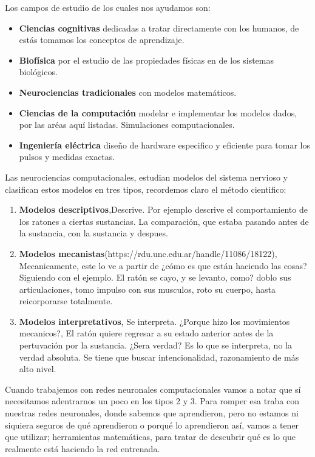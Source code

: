 Los campos de estudio de los cuales nos ayudamos son:
\begin{itemize}
 \item  \textbf{Ciencias cognitivas} dedicadas a tratar directamente con los humanos, de estás tomamos los conceptos de aprendizaje.
 \item  \textbf{Biofísica}  por el estudio de las propiedades físicas en de los sistemas biológicos. 
 \item  \textbf{Neurociencias tradicionales} con modelos matemáticos. 
 
 \item  \textbf{Ciencias de la computación} modelar e implementar los modelos dados, por las aréas aquí listadas. Simulaciones computacionales. 
 
 \item  \textbf{Ingeniería eléctrica} diseño de hardware especifico y eficiente para tomar los pulsos y medidas exactas.  
 
\end{itemize}

Las neurociencias computacionales, estudian modelos del sistema nervioso y clasifican estos modelos en tres tipos, recordemos claro el método cientifico: 

\begin{enumerate}
 \item \textbf{Modelos descriptivos},Descrive. Por ejemplo descrive el comportamiento de los ratones a ciertas sustancias. La comparación, que estaba pasando antes de la sustancia, con la sustancia y despues. 
  
 \item \textbf{Modelos mecanistas}(https://rdu.unc.edu.ar/handle/11086/18122), Mecanicamente, este lo ve a partir de  ¿cómo es que están haciendo las cosas? Siguiendo con el ejemplo. El ratón se cayo, y se levanto, como? doblo sus articulaciones, tomo impulso con sus musculos, roto su cuerpo, hasta reicorporarse totalmente.
 
 \item \textbf{Modelos interpretativos}, Se interpreta. ¿Porque hizo los movimientos mecanicos?, El ratón quiere regresar a su estado anterior antes de la pertuvación por la sustancia. ¿Sera verdad? Es lo que se interpreta, no la verdad absoluta. Se tiene que buscar intencionalidad, razonamiento de más alto nivel.
\end{enumerate}

Cuando trabajemos con redes neuronales computacionales vamos a notar que sí necesitamos adentrarnos un poco en los tipos 2 y 3. Para romper esa traba con nuestras redes neuronales, donde sabemos que aprendieron, pero no estamos ni siquiera seguros de qué aprendieron o porqué lo aprendieron así, vamos a tener que utilizar; herramientas matemáticas, para tratar de descubrir qué es lo que realmente está haciendo la red entrenada. 



